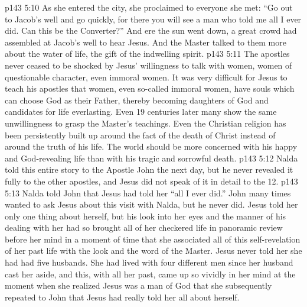 \vs p143 5:10 As she entered the city, she proclaimed to everyone she met: “Go out to Jacob’s well and go quickly, for there you will see a man who told me all I ever did. Can this be the Converter?” And ere the sun went down, a great crowd had assembled at Jacob’s well to hear Jesus. And the Master talked to them more about the water of life, the gift of the indwelling spirit.
\vs p143 5:11 The apostles never ceased to be shocked by Jesus’ willingness to talk with women, women of questionable character, even immoral women. It was very difficult for Jesus to teach his apostles that women, even so\hyp{}called immoral women, have souls which can choose God as their Father, thereby becoming daughters of God and candidates for life everlasting. Even 19 centuries later many show the same unwillingness to grasp the Master’s teachings. Even the Christian religion has been persistently built up around the fact of the death of Christ instead of around the truth of his life. The world should be more concerned with his happy and God\hyp{}revealing life than with his tragic and sorrowful death.
\vs p143 5:12 Nalda told this entire story to the Apostle John the next day, but he never revealed it fully to the other apostles, and Jesus did not speak of it in detail to the 12.
\vs p143 5:13 Nalda told John that Jesus had told her “all I ever did.” John many times wanted to ask Jesus about this visit with Nalda, but he never did. Jesus told her only one thing about herself, but his look into her eyes and the manner of his dealing with her had so brought all of her checkered life in panoramic review before her mind in a moment of time that she associated all of this self\hyp{}revelation of her past life with the look and the word of the Master. Jesus never told her she had had five husbands. She had lived with four different men since her husband cast her aside, and this, with all her past, came up so vividly in her mind at the moment when she realized Jesus was a man of God that she subsequently repeated to John that Jesus had really told her all about herself.

